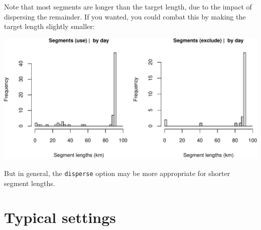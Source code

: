 \documentclass[
]{book}
\newenvironment{Shaded}{\begin{snugshade}}{\end{snugshade}}
\newcommand{\AttributeTok}[1]{\textcolor[rgb]{0.77,0.63,0.00}{#1}}
\newcommand{\CommentTok}[1]{\textcolor[rgb]{0.56,0.35,0.01}{\textit{#1}}}
\newcommand{\ConstantTok}[1]{\textcolor[rgb]{0.00,0.00,0.00}{#1}}
\newcommand{\DecValTok}[1]{\textcolor[rgb]{0.00,0.00,0.81}{#1}}
\newcommand{\FunctionTok}[1]{\textcolor[rgb]{0.00,0.00,0.00}{#1}}
\newcommand{\NormalTok}[1]{#1}
\newcommand{\OtherTok}[1]{\textcolor[rgb]{0.56,0.35,0.01}{#1}}
\newcommand{\SpecialCharTok}[1]{\textcolor[rgb]{0.00,0.00,0.00}{#1}}
\newcommand{\StringTok}[1]{\textcolor[rgb]{0.31,0.60,0.02}{#1}}
\begin{document}
Note that most segments are longer than the target length, due to the impact of dispersing the remainder. If you wanted, you could combat this by making the target length slightly smaller:

\begin{Shaded}
\end{Shaded}

\includegraphics{figures/unnamed-chunk-401-1.pdf}

But in general, the \texttt{disperse} option may be more appropriate for shorter segment lengths.

\hypertarget{typical-settings}{%
\section*{Typical settings}\label{typical-settings}}
\end{document}
